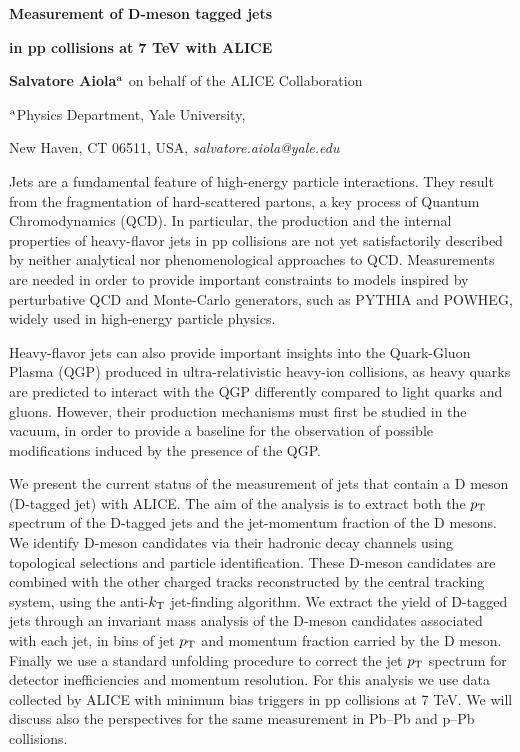 \documentclass[12pt]{article}
\begin{document}
\centerline{\bf 
Measurement of D-meson tagged jets
}

\centerline{\bf 
in pp collisions at 7 TeV with ALICE
}

\vspace{12pt}

\centerline{ {\bf Salvatore Aiola}$^{\rm a}$ on behalf of the ALICE Collaboration }

\vspace{12pt}

\centerline{$^{\rm a}$Physics Department, Yale University,
}\centerline{New Haven, CT 06511, USA, {\it salvatore.aiola@yale.edu}}

\vspace{12pt}


\vspace{12pt} \vspace{12pt}

Jets are a fundamental feature of high-energy particle interactions. 
They result from the fragmentation of hard-scattered partons, 
a key process of Quantum Chromodynamics (QCD). 
In particular, the production and the internal properties of heavy-flavor jets 
in pp collisions are not yet satisfactorily described by neither analytical nor 
phenomenological approaches to QCD. Measurements are needed
in order to provide important constraints to models inspired by perturbative QCD 
and Monte-Carlo generators, such as PYTHIA and POWHEG, widely used in high-energy particle physics.

Heavy-flavor jets can also provide important insights into the Quark-Gluon Plasma (QGP)
produced in ultra-relativistic heavy-ion collisions, as heavy quarks are predicted
to interact with the QGP differently compared to light quarks and gluons. 
However, their production mechanisms must first be studied in the vacuum, 
in order to provide a baseline for the observation of possible modifications induced by the presence of the QGP. 

We present the current status of the measurement of jets that contain a D meson (D-tagged jet) with \mbox{ALICE}.
The aim of the analysis is to extract both the $p_{\rm T}$ spectrum of the D-tagged jets and the jet-momentum fraction of the D mesons. 
We identify D-meson candidates via their hadronic decay channels using topological selections and particle identification.
These D-meson candidates are combined with the other charged tracks reconstructed by the central tracking system, 
using the anti-$k_{\rm T}$ jet-finding algorithm.
We extract the yield of D-tagged jets through an invariant mass analysis of the D-meson candidates associated with each jet, 
in bins of jet $p_{\rm T}$ and momentum fraction carried by the D meson. Finally we use a standard unfolding procedure 
to correct the jet $p_{\rm T}$ spectrum for detector inefficiencies and momentum resolution. For this analysis we use data collected
by ALICE with minimum bias triggers in pp collisions at 7 TeV. We will discuss also
the perspectives for the same measurement in Pb--Pb and p--Pb collisions.
\end{document}
